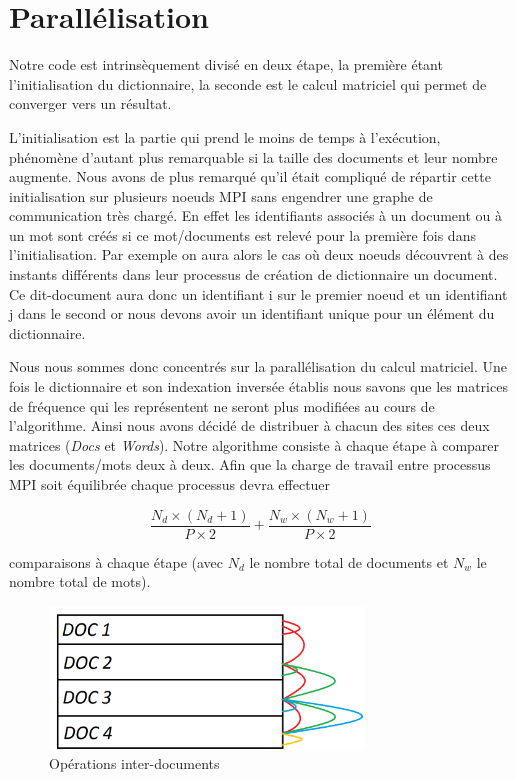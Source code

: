 \section{Parallélisation}

Notre code est intrinsèquement divisé en deux étape,
la première étant l'initialisation du dictionnaire,
la seconde est le calcul matriciel qui permet de
converger vers un résultat.

L'initialisation est la partie qui prend le moins
de temps à l'exécution,
phénomène d'autant plus remarquable si la taille des
documents et leur nombre augmente.
Nous avons de plus remarqué qu'il était compliqué de répartir
cette initialisation sur plusieurs noeuds MPI sans
engendrer une graphe de communication très chargé.
En effet les identifiants associés à un document
ou à un mot sont créés si ce mot/documents est relevé
pour la première fois dans l'initialisation.
Par exemple on aura alors le cas où deux noeuds
découvrent à des instants différents dans leur processus
de création de dictionnaire un document.
Ce dit-document aura donc un identifiant i sur
le premier noeud et un identifiant j dans le second
or nous devons avoir un identifiant unique pour
un élément du dictionnaire.

Nous nous sommes donc concentrés sur la parallélisation
du calcul matriciel.
Une fois le dictionnaire et son indexation inversée
établis nous savons que les matrices de fréquence qui les
représentent ne seront plus modifiées au cours de l'algorithme.
Ainsi nous avons décidé de distribuer à chacun des sites
ces deux matrices ({\it Docs} et {\it Words}).
Notre algorithme consiste à chaque étape à comparer
les documents/mots deux à deux.
Afin que la charge de travail entre processus MPI soit
équilibrée chaque processus devra effectuer

\[ \frac{N_d \times (N_d+1)}{P \times 2}
 + \frac{N_w \times (N_w+1)}{P \times 2} \]

comparaisons à chaque étape
(avec $N_d$ le nombre total de documents
et $N_w$ le nombre total de mots).

\begin{figure}[h]
\begin{center}
\includegraphics[height=1.5in]{cr/1}
\caption{Opérations inter-documents}
\end{center}
\end{figure}

